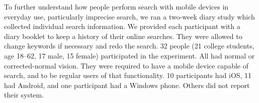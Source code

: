 
To further understand how people perform search with mobile devices in everyday use, particularly imprecise search, we ran a two-week diary study which collected individual search information. We provided each participant with a diary booklet to keep a history of their online searches. They were allowed to change keywords if necessary and redo the search. 32 people (21 college students, age 18--62, 17 male, 15 female) participated in the experiment. All had normal or corrected-normal vision. They were required to have a mobile device capable of search, and to be regular users of that functionality. 10 participants had iOS, 11 had Android, and one participant had a Windows phone. Others did not report their system.




